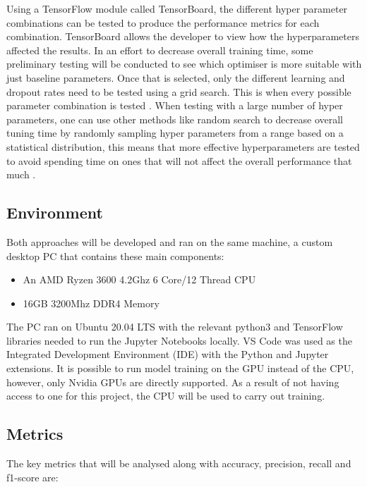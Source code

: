 \documentclass[12pt,a4paper]{report}
\begin{document}
Using a TensorFlow module called TensorBoard, the different hyper parameter combinations can be tested to produce the
performance
metrics for each combination. TensorBoard allows the developer to view how the hyperparameters affected the results. 
In an effort to decrease overall training time, some preliminary testing will be conducted to see which 
optimiser is more suitable with just baseline parameters. Once that is selected, only the different 
learning and dropout rates need to be tested using a grid search. This is when every possible parameter combination is tested 
\citep{gridsearch}. 
When testing with a 
large number of hyper parameters, one can use other methods like random search to decrease overall tuning time by 
randomly sampling hyper parameters from a range based on a statistical distribution, this means that more effective 
hyperparameters are tested to avoid spending time on ones that will not affect the overall performance that
much \citep{sayak}. 

\subsection{Environment}

\label{subsec:env}

Both approaches will be developed and ran on the same machine, a custom desktop PC that contains these main components: 

\begin{itemize}
    \item An AMD Ryzen 3600 4.2Ghz 6 Core/12 Thread CPU
    \item 16GB 3200Mhz DDR4 Memory
\end{itemize}

The PC ran on Ubuntu 20.04 LTS with the relevant python3 and TensorFlow libraries needed to run the Jupyter Notebooks 
locally. VS Code was used as the Integrated Development Environment (IDE) with the Python and Jupyter extensions.  It is
possible to run model training on the GPU instead of the CPU, however, only Nvidia GPUs are directly supported. As a 
result of not having access to one for this project, the CPU will be used to carry out training.

\subsection{Metrics}

The key metrics that will be analysed along with accuracy, precision, recall and f1-score are: 
\end{document}
